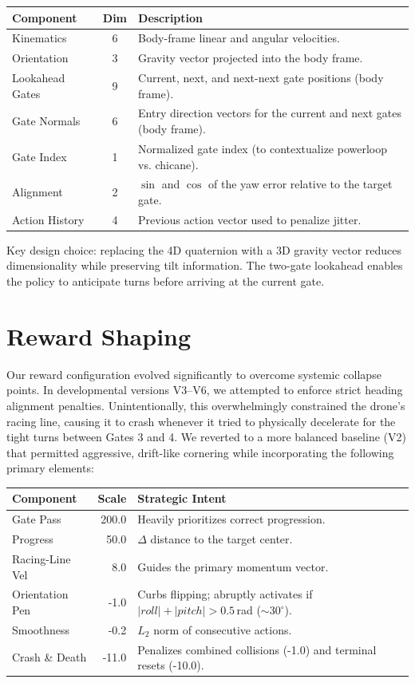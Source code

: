 \documentclass[10pt, twocolumn]{article}
\begin{document}
\begin{table}[h!]
\centering
\small
\begin{tabular}{@{}l c p{4.5cm}@{}}
\toprule
\textbf{Component} & \textbf{Dim} & \textbf{Description} \\
\midrule
Kinematics & 6 & Body-frame linear and angular velocities. \\
Orientation & 3 & Gravity vector projected into the body frame. \\
Lookahead Gates & 9 & Current, next, and next-next gate positions (body frame). \\
Gate Normals & 6 & Entry direction vectors for the current and next gates (body frame). \\
Gate Index & 1 & Normalized gate index (to contextualize powerloop vs. chicane). \\
Alignment & 2 & $\sin$ and $\cos$ of the yaw error relative to the target gate. \\
Action History & 4 & Previous action vector used to penalize jitter. \\
\bottomrule
\end{tabular}
\end{table}
Key design choice: replacing the 4D quaternion with a 3D gravity vector reduces dimensionality while preserving tilt information.
The two-gate lookahead enables the policy to anticipate turns before arriving at the current gate.

\section{Reward Shaping}
Our reward configuration evolved significantly to overcome systemic collapse points. In developmental versions V3--V6, we attempted to enforce strict heading alignment penalties. Unintentionally, this overwhelmingly constrained the drone's racing line, causing it to crash whenever it tried to physically decelerate for the tight turns between Gates 3 and 4. We reverted to a more balanced baseline (V2) that permitted aggressive, drift-like cornering while incorporating the following primary elements:

\begin{table}[ht!]
\centering
\small
\begin{tabular}{@{}l r p{4.2cm}@{}}
\toprule
\textbf{Component} & \textbf{Scale} & \textbf{Strategic Intent} \\
\midrule
Gate Pass & 200.0 & Heavily prioritizes correct progression. \\
Progress & 50.0 & $\Delta$ distance to the target center. \\
Racing-Line Vel & 8.0 & Guides the primary momentum vector. \\
Orientation Pen & -1.0 & Curbs flipping; abruptly activates if $|roll| + |pitch| > 0.5$\,rad ($\sim30^\circ$). \\
Smoothness & -0.2 & $L_2$ norm of consecutive actions. \\
Crash \& Death & -11.0 & Penalizes combined collisions (-1.0) and terminal resets (-10.0). \\
\bottomrule
\end{tabular}
\end{table}
\end{document}
